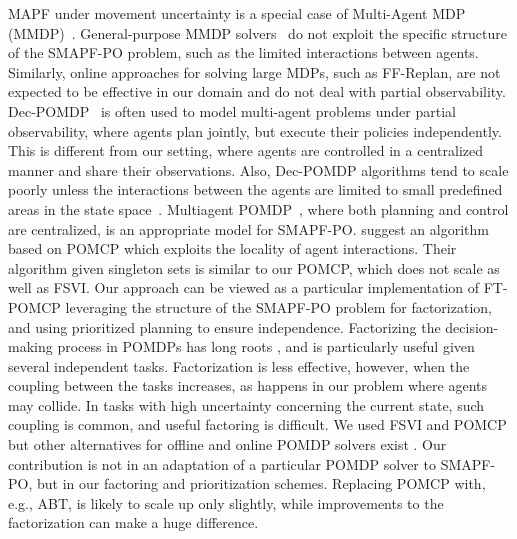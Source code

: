 \documentclass[letterpaper]{article}
\begin{document}
MAPF under movement uncertainty is a special case of Multi-Agent MDP (MMDP)~\cite{boutilier1996planning}.
General-purpose MMDP solvers~\cite{de2021constrained} do not exploit the specific structure of the SMAPF-PO problem, such as the limited interactions between agents. Similarly, online approaches for solving large MDPs, such as FF-Replan\cite{yoon2007ff}, are not expected to be effective in our domain and do not deal with partial observability.
Dec-POMDP~\cite{oliehoek2012decentralized} is often used to model multi-agent problems under partial observability, where agents plan jointly, but execute their policies independently.
This is different from our setting, where agents are controlled in a centralized manner and share their observations.
Also, Dec-POMDP algorithms tend to scale poorly unless the interactions between the agents are limited to small predefined areas in the state space~\cite{melo2009learning}.
Multiagent POMDP~\cite{oliehoek2017madp}, where both planning and control are centralized, is an appropriate model for SMAPF-PO.  \citet{amato2015scalable} suggest an algorithm based on POMCP which exploits the locality of agent interactions.
Their algorithm given singleton sets is similar to our POMCP, which does not scale as well as FSVI.
Our approach can be viewed as a particular implementation of FT-POMCP leveraging the structure of the SMAPF-PO problem for factorization, and using prioritized planning to ensure independence.  Factorizing the decision-making process in POMDPs has long roots \cite[e.g.]{shani2008efficient,veiga2014point}, and is particularly useful given several independent tasks.
Factorization is less effective, however, when the coupling between the tasks increases, as happens in our problem where agents may collide. In tasks with high uncertainty concerning the current state, such coupling is common, and useful factoring is difficult.
We used FSVI and POMCP but other alternatives for offline and online POMDP solvers exist \cite[e.g.]{walraven2019point,kurniawati2016online,ye2017despot}. Our contribution  is not in an adaptation of a particular POMDP solver to SMAPF-PO, but in our factoring and prioritization schemes. Replacing POMCP with, e.g., ABT, is likely to scale up only slightly, while improvements to the factorization can make a huge difference.
\end{document}
